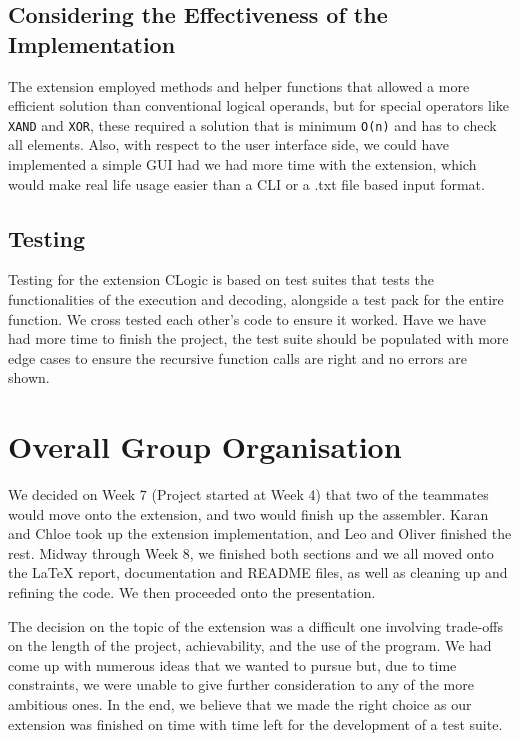 \documentclass[11pt]{article}
\begin{document}
\subsection{Considering the Effectiveness of the Implementation}

The extension employed methods and helper functions that allowed a more efficient solution than conventional logical operands, but for special operators like \texttt{XAND} and \texttt{XOR}, these required a solution that is minimum \texttt{O(n)} and has to check all elements. Also, with respect to the user interface side, we could have implemented a simple GUI had we had more time with the extension, which would make real life usage easier than a CLI or a .txt file based input format.

\subsection{Testing}

Testing for the extension CLogic is based on test suites that tests the functionalities of the execution and decoding, alongside a test pack for the entire function. We cross tested each other's code to ensure it worked. Have we have had more time to finish the project, the test suite should be populated with more edge cases to ensure the recursive function calls are right and no errors are shown.

\section{Overall Group Organisation}

We decided on Week 7 (Project started at Week 4) that two of the teammates would move onto the extension, and two would finish up the assembler.  Karan and Chloe took up the extension implementation, and Leo and Oliver finished the rest.  Midway through Week 8, we finished both sections and we all moved onto the \LaTeX{} report, documentation and README files, as well as cleaning up and refining the code. We then proceeded onto the presentation.

The decision on the topic of the extension was a difficult one involving trade-offs on the length of the project, achievability, and the use of the program.
We had come up with numerous ideas that we wanted to pursue but, due to time constraints, we were unable to give further consideration to any of the more ambitious ones. In the end, we believe that we made the right choice as our extension was finished on time with time left for the development of a test suite.
\end{document}
